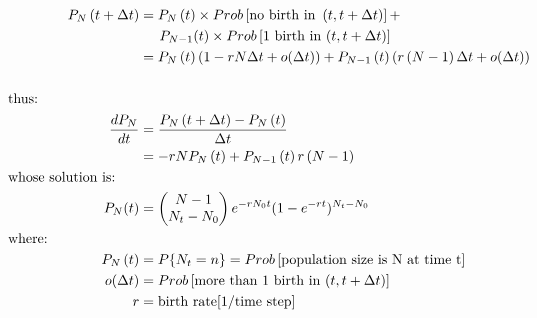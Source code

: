 \documentclass[12pt]{article}
\begin{document}
\begin{align}
P_{N} \left( t + \Delta t \right) & = P_{N} \left( t \right) \times Prob \left[ \text{no birth in } \left( t, t + \Delta t \right) \right]+ \nonumber \\
& \hspace{ 0.2 in}  P_{N-1}(t) \times Prob \left[ \text{1 birth in } (t, t+\Delta t) \right] \nonumber \\
& = P_{N} \left( t \right) \left( 1-rN \Delta t +o(\Delta t) \right)+P_{N-1} \left( t \right) \left( r \left( N-1  \right) \Delta t +o(\Delta t) \right) \nonumber \\
\nonumber \\
&    \hspace{-1.3in}  \text{thus:} \nonumber \\
\dfrac{dP_{N}}{dt} &= \dfrac{P_{N} \left( t+\Delta t \right) - P_{N} \left( t \right)}{\Delta t} \nonumber \\
& = -r N P_{N} \left( t \right) + P_{N-1} \left( t \right) r \left( N-1  \right) \nonumber \\
&    \hspace{-1.3in}  \text{whose solution is:} \nonumber \\
P_{N}(t) &=\begin{pmatrix} N-1\\N_{t}-N_{0} \end{pmatrix} e^{-r N_{0} t} (1-e^{-rt})^{N_{t}-N_{0}} \nonumber \\
&    \hspace{-1.3in}  \text{where:} \nonumber \\
P_{N}\left( t \right) & = P \{N_{t}=n \} = Prob \left[ \text{population size is N at time t} \right] \nonumber \\
o(\Delta t) & = Prob \left[ \text{more than 1 birth in }(t, t+ \Delta t) \right] \nonumber \\
r & = \text{birth rate[1/time step]} \nonumber
\end{align}
\end{document}
